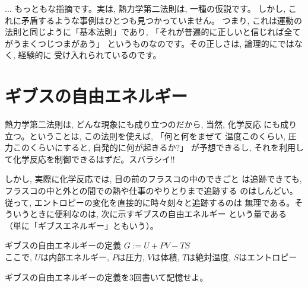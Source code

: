 \begin{faq}{\small{}
 ... もっともな指摘です。実は, 熱力学第二法則は, 一種の仮説です。
しかし, これに矛盾するような事例はひとつも見つかっていません。
つまり, これは運動の法則と同じように「基本法則」であり, 
「それが普遍的に正しいと信じれば全てがうまくつじつまがあう」
というものなのです。その正しさは, 論理的にではなく, 経験的に
受け入れられているのです。}\end{faq}\mv


\section{ギブスの自由エネルギー}

熱力学第二法則は, どんな現象にも成り立つのだから, 当然, 化学反応
にも成り立つ。ということは, この法則を使えば, 「何と何をまぜて
温度このくらい, 圧力このくらいにすると, 自発的に何が起きるか?」
が予想できるし, それを利用して化学反応を制御できるはずだ。スバラシイ!!

しかし, 実際に化学反応では, 目の前のフラスコの中のできごと
は追跡できても, フラスコの中と外との間での熱や仕事のやりとりまで追跡する
のはしんどい。従って, エントロピーの変化を直接的に時々刻々と追跡するのは
無理である。そういうときに便利なのは, 次に示すギブスの自由エネルギー
という量である
（単に「ギブスエネルギー」ともいう）。
\begin{itembox}{ギブスの自由エネルギーの定義}
$G:=U+PV-TS$\\
ここで, $U$は内部エネルギー, $P$は圧力, $V$は体積, $T$は絶対温度, $S$はエントロピー
\end{itembox}

\begin{q}\label{q:themlaw2} ギブスの自由エネルギーの定義を3回書いて記憶せよ。\end{q}\mv

